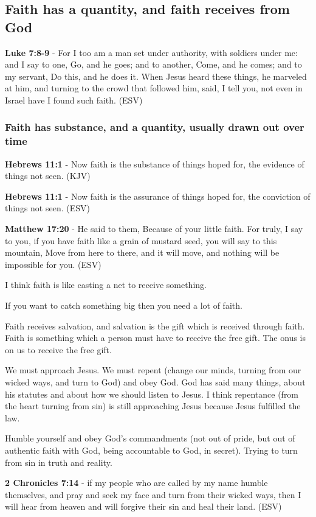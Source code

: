 \documentclass[11pt]{article}
\begin{document}
\subsection{Faith has a quantity, and faith receives from God}
\label{sec:org42d5063}
\textbf{Luke 7:8-9} -  For I too am a man set under authority, with soldiers under me: and I say to one, Go, and he goes; and to another, Come, and he comes; and to my servant, Do this, and he does it.  When Jesus heard these things, he marveled at him, and turning to the crowd that followed him, said, I tell you, not even in Israel have I found such faith.  (ESV)

\subsubsection{Faith has substance, and a quantity, usually drawn out over time}
\label{sec:orgf1c7ad7}
\textbf{Hebrews 11:1} -  Now faith is the substance of things hoped for, the evidence of things not seen.  (KJV)

\textbf{Hebrews 11:1} - Now faith is the assurance of things hoped for, the conviction of things not seen. (ESV)

\textbf{Matthew 17:20} - He said to them, Because of your little faith. For truly, I say to you, if you have faith like a grain of mustard seed, you will say to this mountain, Move from here to there, and it will move, and nothing will be impossible for you. (ESV)

I think faith is like casting a net to receive something.

If you want to catch something big then you need a lot of faith.

Faith receives salvation, and salvation is the gift which is received through faith.
Faith is something which a person must have to receive the free gift.
The onus is on us to receive the free gift.

We must approach Jesus.
We must repent (change our minds, turning from our wicked ways, and turn to God) and obey God.
God has said many things, about his statutes and about how we should listen to Jesus.
I think repentance (from the heart turning from sin) is still approaching Jesus because Jesus fulfilled the law.

Humble yourself and obey God's commandments (not out of pride, but out of authentic faith with God, being accountable to God, in secret).
Trying to turn from sin in truth and reality.

\textbf{2 Chronicles 7:14} -  if my people who are called by my name humble themselves, and pray and seek my face and turn from their wicked ways, then I will hear from heaven and will forgive their sin and heal their land.  (ESV)
\end{document}
